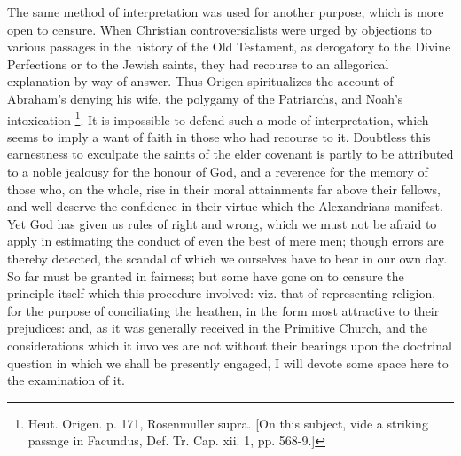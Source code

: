 The same method of interpretation was used for another purpose,
which is more open to censure. When Christian controversialists were
urged by objections to various passages in the history of the Old
Testament, as derogatory to the Divine Perfections or to the Jewish
saints, they had recourse to an allegorical explanation by way of
answer. Thus Origen spiritualizes the account of Abraham's denying his
wife, the polygamy of the Patriarchs, and Noah's intoxication \footnote{Heut. Origen. p. 171, Rosenmuller supra.
[On this subject, vide a striking passage in Facundus, Def. Tr. Cap.
xii. 1, pp. 568-9.]}. It is impossible to defend such a mode of interpretation,
which seems to imply a want of faith in those who had recourse to it.
Doubtless this earnestness to exculpate the saints of the elder
covenant is partly to be attributed to a noble jealousy for the honour
of God, and a reverence for the memory of those who, on the whole,
rise in their moral attainments far above their fellows, and well
deserve the confidence in their virtue which the Alexandrians
manifest. Yet God has given us rules of right and wrong, which we must
not be afraid to apply in estimating the conduct of even the best of
mere men; though errors are thereby detected, the scandal of
which we ourselves have to bear in our own day. So far must be granted
in fairness; but some have gone on to censure the principle itself
which this procedure involved: viz. that of representing religion, for
the purpose of conciliating the heathen, in the form most attractive
to their prejudices: and, as it was generally received in the
Primitive Church, and the considerations which it involves are not
without their bearings upon the doctrinal question in which we shall
be presently engaged, I will devote some space here to the examination
of it.

